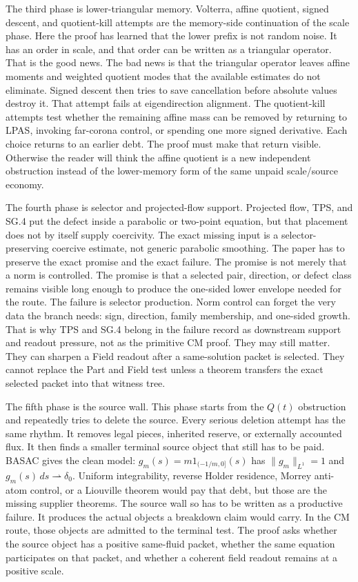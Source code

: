 The third phase is lower-triangular memory.
Volterra, affine quotient, signed descent, and quotient-kill attempts are the
memory-side continuation of the scale phase.
Here the proof has learned that the lower prefix is not random noise.
It has an order in scale, and that order can be written as a triangular
operator.
That is the good news.
The bad news is that the triangular operator leaves affine moments and
weighted quotient modes that the available estimates do not eliminate.
Signed descent then tries to save cancellation before absolute values destroy
it.
That attempt fails at eigendirection alignment.
The quotient-kill attempts test whether the remaining affine mass can be
removed by returning to LPAS, invoking far-corona control, or spending one more
signed derivative.
Each choice returns to an earlier debt.
The proof must make that return visible.
Otherwise the reader will think the affine quotient is a new independent
obstruction instead of the lower-memory form of the same unpaid scale/source
economy.

The fourth phase is selector and projected-flow support.
Projected flow, TPS, and SG.4 put the defect inside a parabolic or two-point
equation, but that placement does not by itself supply coercivity.
The exact missing input is a selector-preserving coercive estimate, not generic
parabolic smoothing.
The paper has to preserve the exact promise and the exact failure.
The promise is not merely that a norm is controlled.
The promise is that a selected pair, direction, or defect class remains visible
long enough to produce the one-sided lower envelope needed for the route.
The failure is selector production.
Norm control can forget the very data the branch needs: sign, direction,
family membership, and one-sided growth.
That is why TPS and SG.4 belong in the failure record as downstream support
and readout pressure, not as the primitive CM proof.
They may still matter.
They can sharpen a Field readout after a same-solution packet is selected.
They cannot replace the Part and Field test unless a theorem transfers the
exact selected packet into that witness tree.

The fifth phase is the source wall.
This phase starts from the \(Q(t)\) obstruction and repeatedly tries to delete
the source.
Every serious deletion attempt has the same rhythm.
It removes legal pieces, inherited reserve, or externally accounted flux.
It then finds a smaller terminal source object that still has to be paid.
BASAC gives the clean model: \(g_m(s)=m1_{(-1/m,0]}(s)\) has
\(\|g_m\|_{L^1}=1\) and \(g_m(s)\,ds\rightharpoonup\delta_0\).
Uniform integrability, reverse Holder residence, Morrey anti-atom control, or
a Liouville theorem would pay that debt, but those are the missing supplier
theorems.
The source wall so has to be written as a productive failure.
It produces the actual objects a breakdown claim would carry.
In the CM route, those objects are admitted to the terminal test.
The proof asks whether the source object has a positive same-fluid packet,
whether the same equation participates on that packet, and whether a coherent
field readout remains at a positive scale.

